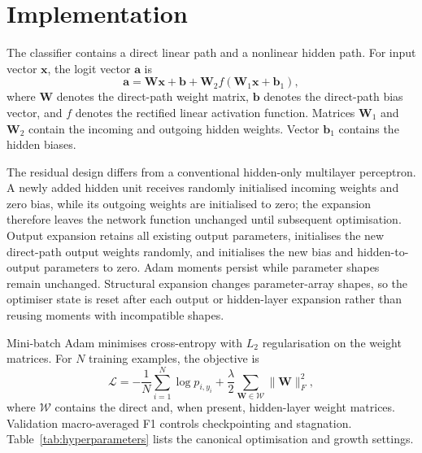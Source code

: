 \documentclass[conference,10pt]{IEEEtran}
\begin{document}
\section{Implementation}
The classifier contains a direct linear path and a nonlinear hidden path. For input vector $\boldsymbol{x}$, the logit vector $\boldsymbol{a}$ is
\begin{equation}
 \boldsymbol{a}=\boldsymbol{W}\boldsymbol{x}+\boldsymbol{b}+
 \boldsymbol{W}_{2}f(\boldsymbol{W}_{1}\boldsymbol{x}+\boldsymbol{b}_{1}),
\end{equation}
where $\boldsymbol{W}$ denotes the direct-path weight matrix, $\boldsymbol{b}$ denotes the direct-path bias vector, and $f$ denotes the rectified linear activation function. Matrices $\boldsymbol{W}_{1}$ and $\boldsymbol{W}_{2}$ contain the incoming and outgoing hidden weights. Vector $\boldsymbol{b}_{1}$ contains the hidden biases.

The residual design differs from a conventional hidden-only multilayer perceptron. A newly added hidden unit receives randomly initialised incoming weights and zero bias, while its outgoing weights are initialised to zero; the expansion therefore leaves the network function unchanged until subsequent optimisation. Output expansion retains all existing output parameters, initialises the new direct-path output weights randomly, and initialises the new bias and hidden-to-output parameters to zero. Adam moments persist while parameter shapes remain unchanged. Structural expansion changes parameter-array shapes, so the optimiser state is reset after each output or hidden-layer expansion rather than reusing moments with incompatible shapes.

Mini-batch Adam minimises cross-entropy with $L_2$ regularisation on the weight matrices. For $N$ training examples, the objective is
\begin{equation}
 \mathcal{L}=-\frac{1}{N}\sum_{i=1}^{N}\log p_{i,y_i}
 +\frac{\lambda}{2}\sum_{\boldsymbol{W}\in\mathcal{W}}\lVert\boldsymbol{W}\rVert_F^2,
\end{equation}
where $\mathcal{W}$ contains the direct and, when present, hidden-layer weight matrices. Validation macro-averaged F1 controls checkpointing and stagnation. Table~\ref{tab:hyperparameters} lists the canonical optimisation and growth settings.
\end{document}
